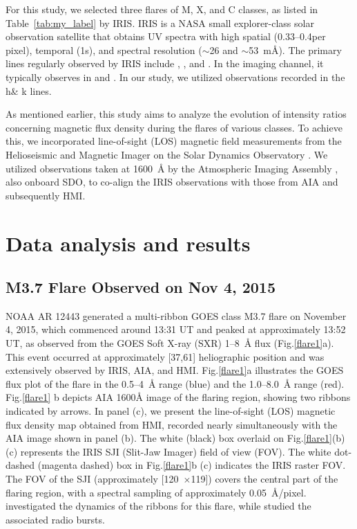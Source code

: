 For this study, we selected three flares of M, X, and C classes, as listed in Table~\ref{tab:my_label} by IRIS. IRIS is a NASA small explorer-class solar observation satellite that obtains UV spectra with high spatial (0.33{--}0.4\arcsec per pixel), temporal (1s), and spectral resolution ($\sim$26 and $\sim$53~m{\AA}). The primary lines regularly observed by IRIS include ,  , and . In the imaging channel, it typically observes in   and . In our study, we utilized observations recorded in the   h\& k lines.

As mentioned earlier, this study aims to analyze the evolution of intensity ratios concerning magnetic flux density during the flares of various classes. To achieve this, we incorporated line-of-sight (LOS) magnetic field measurements from the Helioseismic and Magnetic Imager \citep[HMI;][]{hmi} on the Solar Dynamics Observatory \citep[SDO;][]{sdo}. We utilized observations taken at 1600~{\AA} by the Atmospheric Imaging Assembly \citep[AIA;][]{aia}, also onboard SDO, to co-align the IRIS observations with those from AIA and subsequently HMI.

\section{Data analysis and results} \label{sec:dar}
\subsection{M3.7 Flare Observed on Nov 4, 2015}

NOAA AR 12443 generated a multi-ribbon GOES class M3.7 flare on November 4, 2015, which commenced around 13:31 UT and peaked at approximately 13:52 UT, as observed from the GOES Soft X-ray (SXR) 1{--}8~{\AA} flux (Fig.\ref{flare1}a). This event occurred at approximately [37\arcsec,61\arcsec] heliographic position and was extensively observed by IRIS, AIA, and HMI. Fig.\ref{flare1}a illustrates the GOES flux plot of the flare in the 0.5{--}4~{\AA} range (blue) and the 1.0{--}8.0~{\AA} range (red). Fig.\ref{flare1} b depicts AIA 1600{\AA} image of the flaring region, showing two ribbons indicated by arrows. In panel (c), we present the line-of-sight (LOS) magnetic flux density map obtained from HMI, recorded nearly simultaneously with the AIA image shown in panel (b). The white (black) box overlaid on Fig.\ref{flare1}(b) (c) represents the IRIS SJI (Slit-Jaw Imager) field of view (FOV). The white dot-dashed (magenta dashed) box in Fig.\ref{flare1}b (c) indicates the IRIS raster FOV. The FOV of the SJI (approximately [120\arcsec~$\times$119\arcsec]) covers the central part of the flaring region, with a spectral sampling of approximately 0.05~{\AA}/pixel. \cite{li17} investigated the dynamics of the ribbons for this flare, while \cite{karlick18} studied the associated radio bursts.

